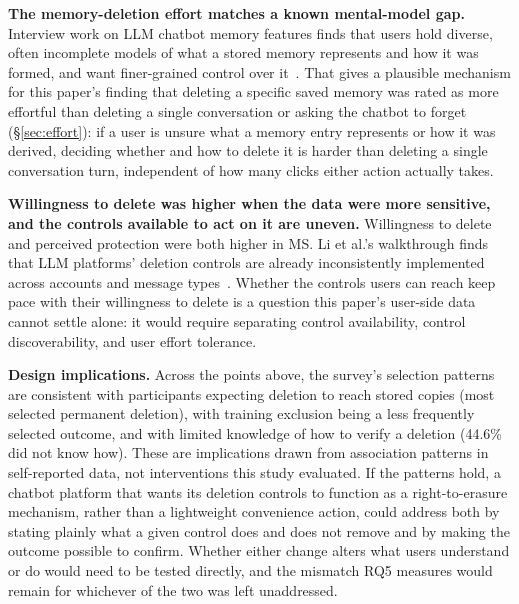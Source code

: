 \documentclass[conference,compsoc]{IEEEtran}
\begin{document}
\textbf{The memory-deletion effort matches a known mental-model gap.}
Interview work on LLM chatbot memory features finds that users hold
diverse, often incomplete models of what a stored memory represents
and how it was formed, and want finer-grained control over
it~\cite{zhang2025understanding}. That gives a plausible mechanism for
this paper's finding that deleting a specific saved memory was rated as
more effortful than deleting a single conversation or asking the chatbot
to forget (\S\ref{sec:effort}): if a user is unsure what a memory
entry represents or how it was derived, deciding whether and how to
delete it is harder than deleting a single conversation turn, independent
of how many clicks either action actually takes.

\textbf{Willingness to delete was higher when the data were more sensitive,
and the controls available to act on it are uneven.} Willingness to delete and
perceived protection were both higher in MS. Li et al.'s
walkthrough finds that LLM platforms' deletion controls are already
inconsistently implemented across accounts and message types~\cite{li2026privacy}.
Whether the controls users can reach keep pace with their willingness to
delete is a question this paper's user-side data cannot settle alone: it would
require separating control availability, control discoverability, and user
effort tolerance.

\textbf{Design implications.} Across the points above, the survey's selection
patterns are consistent with participants expecting deletion to reach stored
copies (most selected permanent deletion), with training exclusion being a
less frequently selected outcome, and with limited knowledge of how to verify
a deletion (44.6\% did not know how). These are implications drawn from
association patterns in self-reported data, not interventions this study
evaluated. If the patterns hold, a chatbot platform that wants its deletion
controls to function as a right-to-erasure mechanism, rather than a
lightweight convenience action, could address both by stating plainly what a
given control does and does not remove and by making the outcome possible to
confirm. Whether either change alters what users understand or do would need
to be tested directly, and the mismatch RQ5 measures would remain for
whichever of the two was left unaddressed.
\end{document}
